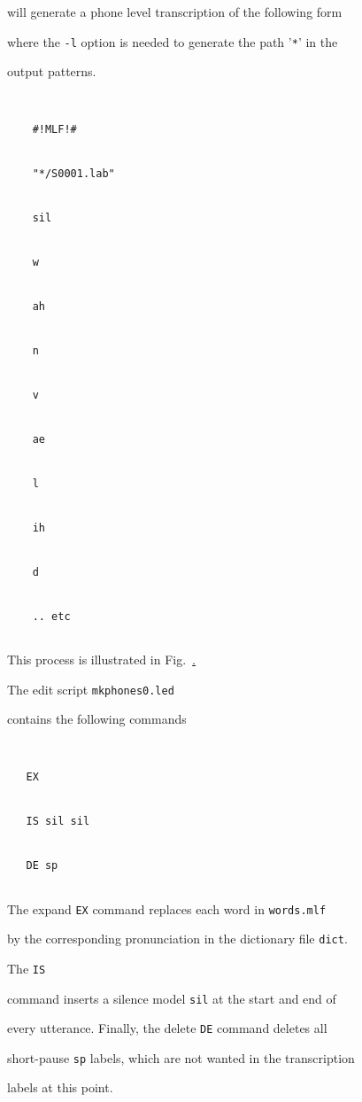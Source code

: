 will generate a phone level transcription of the following form


where the \texttt{-l} option is needed to generate the path '\verb+*+' in the 


output patterns.


\begin{verbatim}


    #!MLF!#


    "*/S0001.lab"


    sil


    w


    ah


    n


    v


    ae


    l


    ih


    d


    .. etc


\end{verbatim}


This process is illustrated in Fig.~\href{f:step4}.





The  edit script \texttt{mkphones0.led} 


contains the following commands


\begin{verbatim}


   EX


   IS sil sil


   DE sp


\end{verbatim}


The expand \texttt{EX} command replaces each word in \texttt{words.mlf} 


by the corresponding pronunciation in the dictionary file \texttt{dict}.  


The \texttt{IS}


command inserts a silence model \texttt{sil} at the start and end of


every utterance.  Finally, the delete \texttt{DE} command deletes all


short-pause \texttt{sp} labels, which are not wanted in the transcription


labels at this point.  










